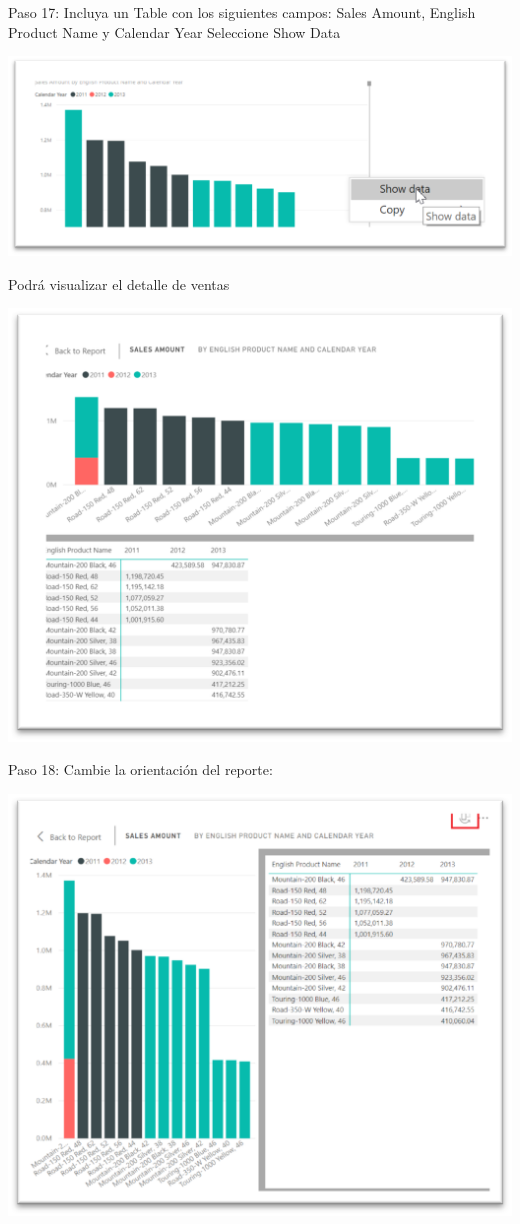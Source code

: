\documentclass[12pt,letterpaper]{article}
\begin{document}
Paso 17: Incluya un Table con los siguientes campos: Sales Amount, English Product Name y Calendar Year Seleccione Show Data
\begin{center}
    \includegraphics[width=16cm]{img/20.png}  
\end{center}
Podrá visualizar el detalle de ventas
\begin{center}
    \includegraphics[width=16cm]{img/21.png}  
\end{center}
Paso 18: Cambie la orientación del reporte:
\begin{center}
    \includegraphics[width=16cm]{img/22.png}  
\end{center}
\end{document}
